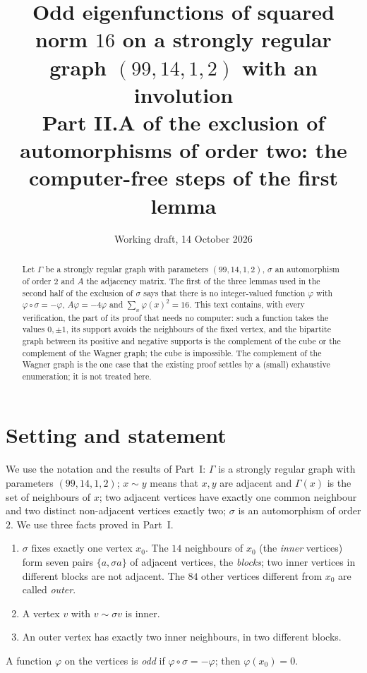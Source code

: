 \documentclass[11pt,a4paper]{article}
\title{Odd eigenfunctions of squared norm $16$ on a strongly regular graph $(99,14,1,2)$ with an involution\\[4pt]
\large Part II.A of the exclusion of automorphisms of order two: the computer-free steps of the first lemma}
\author{Working draft, 14 October 2026}
\date{}
\theoremstyle{remark}
\newcommand{\sg}{\sigma}
\newcommand{\Nb}{\Gamma}
\begin{document}
\maketitle

\begin{abstract}
Let $\Gamma$ be a strongly regular graph with parameters $(99,14,1,2)$, $\sg$ an automorphism of order $2$ and $A$ the
adjacency matrix. The first of the three lemmas used in the second half of the exclusion of $\sg$ says that there is
no integer-valued function $\varphi$ with $\varphi\circ\sg=-\varphi$, $A\varphi=-4\varphi$ and
$\sum_x\varphi(x)^2=16$. This text contains, with every verification, the part of its proof that needs no computer:
such a function takes the values $0,\pm1$, its support avoids the neighbours of the fixed vertex, and the bipartite
graph between its positive and negative supports is the complement of the cube or the complement of the Wagner
graph; the cube is impossible. The complement of the Wagner graph is the one case that the existing proof settles by
a (small) exhaustive enumeration; it is not treated here.
\end{abstract}

\section{Setting and statement}

We use the notation and the results of Part~I: $\Gamma$ is a strongly regular graph with parameters $(99,14,1,2)$;
$x\sim y$ means that $x,y$ are adjacent and $\Nb(x)$ is the set of neighbours of $x$; two adjacent vertices have
exactly one common neighbour and two distinct non-adjacent vertices exactly two; $\sg$ is an automorphism of order
$2$. We use three facts proved in Part~I.
\begin{enumerate}[label=\textup{(F\arabic*)},leftmargin=3em]
\item\label{F1} $\sg$ fixes exactly one vertex $x_0$. The $14$ neighbours of $x_0$ (the \emph{inner} vertices) form
seven pairs $\{a,\sg a\}$ of adjacent vertices, the \emph{blocks}; two inner vertices in different blocks are not
adjacent. The $84$ other vertices different from $x_0$ are called \emph{outer}.
\item\label{F2} A vertex $v$ with $v\sim\sg v$ is inner.
\item\label{F3} An outer vertex has exactly two inner neighbours, in two different blocks.
\end{enumerate}
A function $\varphi$ on the vertices is \emph{odd} if $\varphi\circ\sg=-\varphi$; then $\varphi(x_0)=0$.
\end{document}
